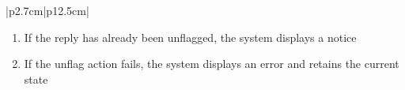 \begin{table}[H]
\begin{tabular}{|p{2.7cm}|p{12.5cm}|}
\begin{minipage}[t]{\linewidth}
                                      \begin{enumerate}[topsep=0pt,itemsep=1pt,parsep=0pt,partopsep=0pt]
                                          \item If the reply has already been unflagged, the system displays a notice
                                          \item If the unflag action fails, the system displays an error and retains the
                                                current state
                                      \end{enumerate}
                                  \end{minipage}                             \\ \hline
    \end{tabular}
    \label{tab:admin-unflag-reply}
\end{table}



